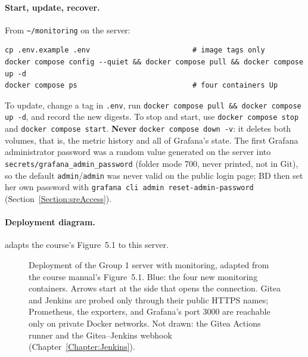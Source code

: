 \begin{longlisting}
\inputminted[fontsize=\scriptsize]{yaml}{config/monitoring/compose.yaml}
\caption{\texttt{compose.yaml} of the monitoring stack (\texttt{infra/monitoring}): four containers, no published ports, memory limits, named volumes, Grafana also on the existing \texttt{gitea\_web} network.}
\label{Listing:ESreCompose}
\end{longlisting}

\paragraph{Start, update, recover.} From \texttt{\textasciitilde/monitoring} on the server:
\begin{verbatim}
cp .env.example .env                        # image tags only
docker compose config --quiet && docker compose pull && docker compose up -d
docker compose ps                           # four containers Up
\end{verbatim}
To update, change a tag in \texttt{.env}, run \texttt{docker compose pull \&\& docker compose up -d}, and record the new
digests. To stop and start, use \texttt{docker compose stop} and \texttt{docker compose start}. \textbf{Never}
\texttt{docker compose down -v}: it deletes both volumes, that is, the metric history and all of Grafana's state.
The first Grafana administrator password was a random value generated on the server into
\texttt{secrets/grafana\_admin\_password} (folder mode 700, never printed, not in Git), so the default
\texttt{admin}/\texttt{admin} was never valid on the public login page; BD then set her own password with
\texttt{grafana cli admin reset-admin-password} (Section~\ref{Section:sreAccess}).

\paragraph{Deployment diagram.}  adapts the course's Figure~5.1 to this server.

\begin{figure}[htbp]\centering
\resizebox{\linewidth}{!}{}
\caption{Deployment of the Group 1 server with monitoring, adapted from the course manual's Figure~5.1. Blue: the four new
monitoring containers. Arrows start at the side that opens the connection. Gitea and Jenkins are probed only through their
public HTTPS names; Prometheus, the exporters, and Grafana's port 3000 are reachable only on private Docker networks.
Not drawn: the Gitea Actions runner and the Gitea--Jenkins webhook (Chapter~\ref{Chapter:Jenkins}).}
\label{Fig:ESreDeployment}
\end{figure}

